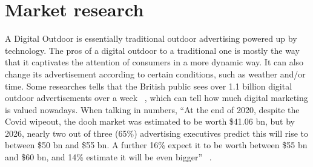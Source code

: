 \section{Market research}
\label{sec:market-research}
A Digital Outdoor is essentially traditional outdoor advertising powered up by technology. 
The pros of a digital outdoor to a traditional one is mostly the way that it captivates the attention of consumers in a more dynamic way. 
It can also change its advertisement according to certain conditions, such as weather and/or time. Some researches tells that the British public sees over 1.1 billion digital outdoor advertisements over a week ~\cite{digital-outdoor}, which can tell how much digital marketing is valued nowadays. 
When talking in numbers, ``At the end of 2020, despite the Covid wipeout, the \gls{dooh} market was estimated to be worth \$41.06 \gls{bn}, but by 2026, nearly two out of three (65\%) advertising executives predict this will rise to between \$50 \gls{bn} and \$55 bn. 
A further 16\% expect it to be worth between \$55 \gls{bn} and \$60 \gls{bn}, and 14\% estimate it will be even bigger'' ~\cite{outdoor-market}.



